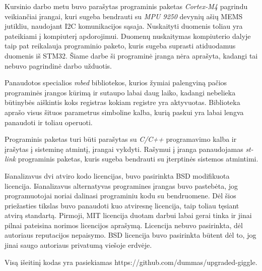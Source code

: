 Kursinio darbo metu buvo parašytas programinis paketas \textit{Cortex-M4} pagrindu veikiančiai įrangai, kuri sugeba bendrauti su \textit{MPU 9250} devynių ašių MEMS jutikliu, naudojant I2C komunikacijos sąsaja. Nuskaityti duomenis toliau yra pateikiami į kompiuterį apdorojimui. 
Duomenų nuskaitymas kompiuterio dalyje taip pat reikalauja programinio paketo, kuris sugeba suprasti atiduodamus duomenis iš STM32. 
Šiame darbe ši programinė įranga nėra aprašyta, kadangi tai nebuvo pagrindinė darbo užduotis.

Panaudotos specialios \textit{mbed} bibliotekos, kurios žymiai palengviną pačios programinės įrangos kūrimą ir sutaupo labai daug laiko, kadangi nebelieka būtinybės aiškintis koks registras kokiam registre yra aktyvuotas. Biblioteka aprašo visus šituos parametrus simboline kalba, kurią paskui yra labai lengva panaudoti ir toliau operuoti.

Programinis paketas turi būti parašytas su \textit{C/C++} programavimo kalba ir įrašytas į sisteminę atmintį, įrangai vykdyti. Rašymui į įranga panaudojamas \textit{st-link} programinis paketas, kuris sugeba bendrauti su įterptinės sistemos atmintimi.

Išanalizavus dvi atviro kodo licencijas, buvo pasirinkta BSD modifikuota licencija. 
Išanalizavus alternatyvas programines įrangas buvo pastebėta, jog programuotojai noriai dalinasi programiniu kodu su bendruomene. 
Dėl šios priežasties tikslas buvo panaudoti kuo atviresnę licencija, taip toliau tęsiant atvirą standartą.
Pirmoji, MIT licencija duotam darbui labai gerai tinka ir jinai pilnai pateisina norimos licencijos aprašymą.
Licencija nebuvo pasirinkta, dėl autoriaus reputacijos nepaisymo.
BSD licencija buvo pasirinkta būtent dėl to, jog jinai saugo autoriaus privatumą viešoje erdvėje.

Visą išeitinį kodas yra pasiekiamas https://github.com/dummas/upgraded-giggle.